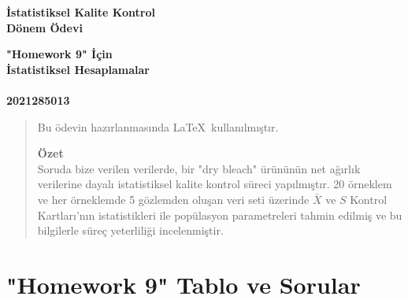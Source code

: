 \documentclass[a4paper,12pt]{article}
\begin{document}
	\begin{titlepage}
		\begin{center}
			
			\vspace*{3cm}
			\huge\bfseries İstatistiksel Kalite Kontrol \\Dönem Ödevi
			\vspace*{6cm}
			\begin{center}
				\huge\bfseries{"Homework 9" İçin\\ İstatistiksel Hesaplamalar}\\
				\\
				\textsc{\small 2021285013}\\
			\end{center}
		 	
		 	\vspace*{\fill}
			
		 			
		\end{center}
	\end{titlepage}
	
	\begin{quote}
		
		\vspace*{\fill}
		\begin{center}
			Bu ödevin hazırlanmasında \LaTeX\ kullanılmıştır.
		\end{center}
		\vspace*{8cm}
		\textbf{Özet}\\
		Soruda bize verilen verilerde, bir "dry bleach" ürününün net ağırlık verilerine dayalı istatistiksel kalite kontrol süreci yapılmıştır. 20 örneklem ve her örneklemde 5 gözlemden oluşan veri seti üzerinde $\bar{X}$ ve $S$ Kontrol Kartları'nın istatistikleri ile popülasyon parametreleri tahmin edilmiş ve bu bilgilerle süreç yeterliliği incelenmiştir.
		
		
		\vspace*{\fill}
		
		\cleardoublepage
	
	\end{quote}
	
	\begin{quote}
		\tableofcontents
		\cleardoublepage
	\end{quote}
	
		
	\setcounter{page}{1}
	

\section{"Homework 9" Tablo ve Sorular}
\end{document}
